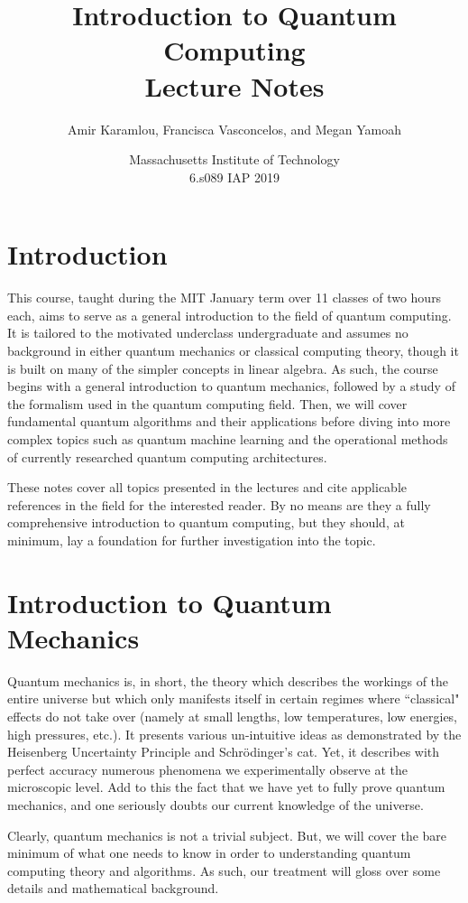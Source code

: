 \documentclass[11pt]{article} %
\author{Amir Karamlou, Francisca Vasconcelos, and Megan Yamoah}
\title{Introduction to Quantum Computing\\Lecture Notes}
\date{Massachusetts Institute of Technology\\6.s089 IAP 2019}
\begin{document}
\maketitle
\newpage
\tableofcontents
\newpage

\section{Introduction}
This course, taught during the MIT January term over 11 classes of two hours each, aims to serve as a general introduction to the field of quantum computing. It is tailored to the motivated underclass undergraduate and assumes no background in either quantum mechanics or classical computing theory, though it is built on many of the simpler concepts in linear algebra. As such, the course begins with a general introduction to quantum mechanics, followed by a study of the formalism used in the quantum computing field. Then, we will cover fundamental quantum algorithms and their applications before diving into more complex topics such as quantum machine learning and the operational methods of currently researched quantum computing architectures.

These notes cover all topics presented in the lectures and cite applicable references in the field for the interested reader. By no means are they a fully comprehensive introduction to quantum computing, but they should, at minimum, lay a foundation for further investigation into the topic.

\section{Introduction to Quantum Mechanics}

Quantum mechanics is, in short, the theory which describes the workings of the entire universe but which only manifests itself in certain regimes where ``classical" effects do not take over (namely at small lengths, low temperatures, low energies, high pressures, etc.). It presents various un-intuitive ideas as demonstrated by the Heisenberg Uncertainty Principle and Schr\"odinger's cat. Yet, it describes with perfect accuracy numerous phenomena we experimentally observe at the microscopic level. Add to this the fact that we have yet to fully prove quantum mechanics, and one seriously doubts our current knowledge of the universe.

Clearly, quantum mechanics is not a trivial subject. But, we will cover the bare minimum of what one needs to know in order to understanding quantum computing theory and algorithms. As such, our treatment will gloss over some details and mathematical background. 
\end{document}
